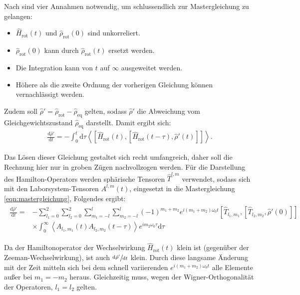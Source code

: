 Nach \cite[S. 276]{abragam1961principles} sind vier Annahmen notwendig, um schlussendlich zur Mastergleichung zu gelangen:
\begin{itemize}
\item $\hat{H}_\text{rot}(t)$ und $\hat{\rho}_\text{rot}(0)$ sind unkorreliert.
\item $\hat{\rho}_\text{rot}(0)$ kann durch $\hat{\rho}_\text{rot}(t)$ ersetzt werden.
\item Die Integration kann von $t$ auf $\infty$ ausgeweitet werden.
\item Höhere als die zweite Ordnung der vorherigen Gleichung können vernachlässigt werden.
\end{itemize}
Zudem soll $\hat{\rho}' = \hat{\rho}_\text{rot} - \hat{\rho}_\text{eq}$ gelten, sodass $\hat{\rho}'$ die Abweichung vom Gleichgewichtszustand $\hat{\rho}_\text{eq}$ darstellt.
Damit ergibt sich:
\begin{align}
    \frac{\text{d} \hat{\rho}'}{\text{d}t} = - \int_0^t \text{d} \tau \left< \left[\hat{H}_\text{rot}(t), [\hat{H}_\text{rot}(t-\tau), \hat{\rho}'(t)] \right] \right>. \label{eqn:mastergleichung}
\end{align}

Das Lösen dieser Gleichung gestaltet sich recht umfangreich, daher soll die Rechnung hier nur in groben Zügen nachvollzogen werden.
Für die Darstellung des Hamilton-Operators werden sphärische Tensoren $\hat{T}^{l,m}$ verwendet, sodass sich mit den Laborsystem-Tensoren $A^{l,m}(t)$, eingesetzt in die Mastergleichung \eqref{eqn:mastergleichung}, Folgendes ergibt:
\begin{align}
\begin{split}
    \frac{\text{d} \hat{\rho}'}{\text{d}t} =& -\sum_{l_1 = 0}^2 \sum_{l_2 = 0}^2 \sum_{m_1 = -l}^l \sum_{m_2 = -l}^l (-1)^{m_1+m_2} e^{i(m_1+m_2) \omega_0 t} \left[\hat{T}_{l_1,m_1}, [\hat{T}_{l_2,m_2}, \hat{\rho}'(0)] \right] \\ &\times \int_0^\infty \left< A_{l_1,m_1}(t) A_{l_2,m_2}(t-\tau) \right> e^{i m_2 \omega_0 \tau} \text{d} \tau
\end{split}
\end{align}

Da der Hamiltonoperator der Wechselwirkung $\hat{H}_\text{rot}(t)$ klein ist (gegenüber der Zeeman-Wechselwirkung), ist auch $\sfrac{\text{d} \hat{\rho}'}{\text{d}t}$ klein. Durch diese langsame Änderung mit der Zeit mitteln sich bei dem schnell variierenden $e^{i(m_1+m_2) \omega_0 t}$ alle Elemente außer bei $m_1 = - m_2$ heraus. Gleichzeitig muss, wegen der Wigner-Orthogonalität der Operatoren, $l_1 = l_2$ gelten.

